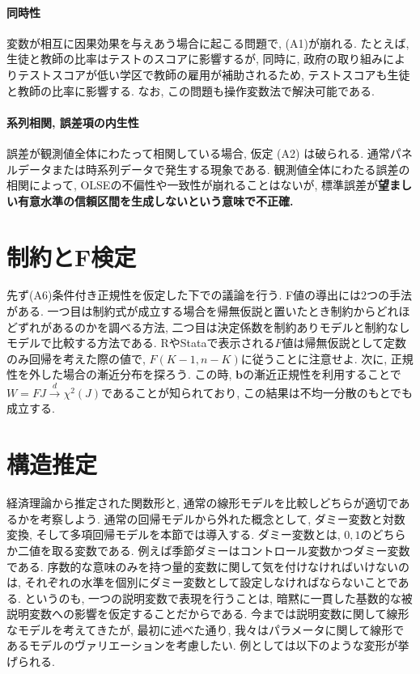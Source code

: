 \documentclass[paper=a4paper,fontsize=10pt]{jlreq}
\begin{document}
\paragraph{同時性}
変数が相互に因果効果を与えあう場合に起こる問題で, (A1)が崩れる. 
たとえば, 生徒と教師の比率はテストのスコアに影響するが, 同時に, 政府の取り組みによりテストスコアが低い学区で教師の雇用が補助されるため, テストスコアも生徒と教師の比率に影響する. なお, この問題も操作変数法で解決可能である.\\

\paragraph{系列相関, 誤差項の内生性}
誤差が観測値全体にわたって相関している場合, 仮定 (A2) は破られる. 通常パネルデータまたは時系列データで発生する現象である. 観測値全体にわたる誤差の相関によって, OLSEの不偏性や一致性が崩れることはないが, 標準誤差が\rmfamily\mcfamily\bfseries{望ましい有意水準の信頼区間を生成しない}\mdseries という意味で不正確. \\

\section{制約とF検定}
先ず(A6)条件付き正規性を仮定した下での議論を行う. F値の導出には$2$つの手法がある. 一つ目は制約式が成立する場合を帰無仮説と置いたとき制約からどれほどずれがあるのかを調べる方法, 二つ目は決定係数を制約ありモデルと制約なしモデルで比較する方法である. RやStataで表示される$F$値は帰無仮説として定数のみ回帰を考えた際の値で, $F(K-1, n-K)$に従うことに注意せよ. 次に, 正規性を外した場合の漸近分布を探ろう. この時, $\mathbf{b}$の漸近正規性を利用することで$W=F J\overset{d}{\to}\chi ^2(J)$であることが知られており, この結果は不均一分散のもとでも成立する.\\

\section{構造推定}
経済理論から推定された関数形と, 通常の線形モデルを比較しどちらが適切であるかを考察しよう. 通常の回帰モデルから外れた概念として, ダミー変数と対数変換, そして多項回帰モデルを本節では導入する. ダミー変数とは, $0, 1$のどちらか二値を取る変数である. 例えば季節ダミーはコントロール変数かつダミー変数である. 序数的な意味のみを持つ量的変数に関して気を付けなければいけないのは, それぞれの水準を個別にダミー変数として設定しなければならないことである. というのも, 一つの説明変数で表現を行うことは, 暗黙に一貫した基数的な被説明変数への影響を仮定することだからである. 今までは説明変数に関して線形なモデルを考えてきたが, 最初に述べた通り, 我々はパラメータに関して線形であるモデルのヴァリエーションを考慮したい. 例としては以下のような変形が挙げられる.
\end{document}
